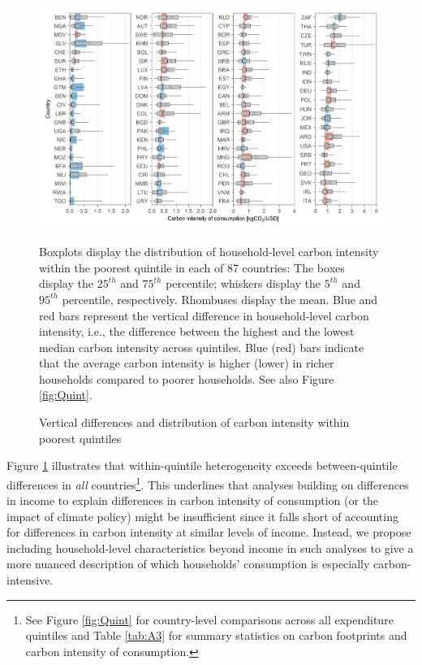\documentclass[12pt, a4paper]{article}
\newenvironment{subcaption2}
{\strut
\vspace{-5pt}
\begin{minipage}[b]{0.9\textwidth}
  \hspace*{-\parindent}
  \footnotesize}
 {\end{minipage}}
\begin{document}
\begin{figure}[ht!]
    \centering
    \includegraphics{Figure 1/Figure_1_2017}
    \caption{Vertical differences and distribution of carbon intensity within poorest quintiles}
    \label{fig:fig_1}
    \begin{subcaption2}
    Boxplots display the distribution of household-level carbon intensity within the poorest quintile in each of 87 countries: The boxes display the $25^{th}$ and $75^{th}$ percentile; whiskers display the $5^{th}$ and $95^{th}$ percentile, respectively. Rhombuses display the mean. Blue and red bars represent the vertical difference in household-level carbon intensity, i.e., the difference between the highest and the lowest median carbon intensity across quintiles. Blue (red) bars indicate that the average carbon intensity is higher (lower) in richer households compared to poorer households. See also Figure \ref{fig:Quint}.
    \end{subcaption2}
\end{figure}

Figure \ref{fig:fig_1} illustrates that within-quintile heterogeneity exceeds between-quintile differences in \textit{all} countries\footnote{See Figure \ref{fig:Quint} for country-level comparisons across all expenditure quintiles and Table \ref{tab:A3} for summary statistics on carbon footprints and carbon intensity of consumption.}. This underlines that analyses building on differences in income to explain differences in carbon intensity of consumption (or the impact of climate policy) might be insufficient since it falls short of accounting for differences in carbon intensity at similar levels of income. Instead, we propose including household-level characteristics beyond income in such analyses to give a more nuanced description of which households' consumption is especially carbon-intensive.
\end{document}
